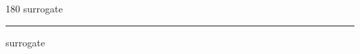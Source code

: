 
\begin{frame}
\begin{center}
\begin{turn}{180}
{\fontsize{2.5cm}{1em}\selectfont surrogate}
\end{turn}
\vspace{1em}\par  
\hrule
\vspace{1em}\par  
{\fontsize{2.5cm}{1em}\selectfont surrogate}
\end{center}
\end{frame}
